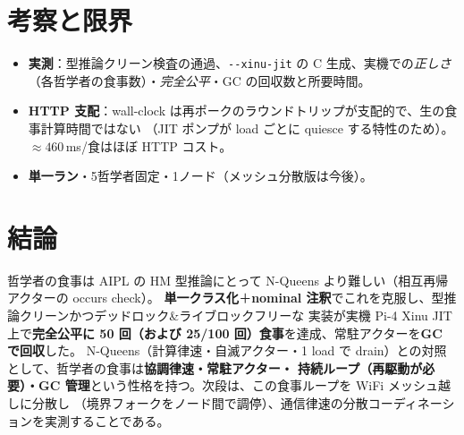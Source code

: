 \documentclass[11pt]{ltjsarticle}
\begin{document}
\section{考察と限界}
\begin{itemize}
  \item \textbf{実測}：型推論クリーン検査の通過、\texttt{-{}-xinu-jit} の C 生成、実機での\emph{正しさ}
  （各哲学者の食事数）・\emph{完全公平}・GC の回収数と所要時間。
  \item \textbf{HTTP 支配}：wall-clock は再ポークのラウンドトリップが支配的で、生の食事計算時間ではない
  （JIT ポンプが load ごとに quiesce する特性のため）。$\approx 460$\,ms/食はほぼ HTTP コスト。
  \item \textbf{単一ラン}・5哲学者固定・1ノード（メッシュ分散版は今後）。
\end{itemize}

\section{結論}
哲学者の食事は AIPL の HM 型推論にとって N-Queens より難しい（相互再帰アクターの occurs check）。
\textbf{単一クラス化}＋\textbf{nominal 注釈}でこれを克服し、型推論クリーンかつデッドロック\&ライブロックフリーな
実装が実機 Pi-4 Xinu JIT 上で\textbf{完全公平に 50 回（および 25/100 回）食事}を達成、常駐アクターを\textbf{GC で回収}した。
N-Queens（計算律速・自滅アクター・1 load で drain）との対照として、哲学者の食事は\textbf{協調律速・常駐アクター・
持続ループ（再駆動が必要）・GC 管理}という性格を持つ。次段は、この食事ループを WiFi メッシュ越しに分散し
（境界フォークをノード間で調停）、通信律速の分散コーディネーションを実測することである。
\end{document}
